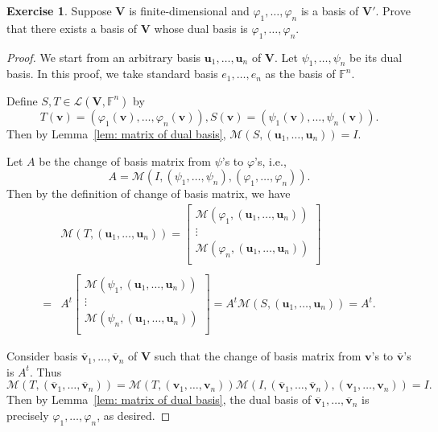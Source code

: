 \documentclass{tufte-handout}
\def \v {\vspace{0.2cm}}
\theoremstyle{plain} %
\theoremstyle{definition}
\newtheorem{exer}[thm]{Exercise}
\theoremstyle{remark}
\newcommand{\bra}[1]{\mathopen{}\left(#1\right)}
\renewcommand{\phi}{\varphi}
\newcommand{\F}{\mathbb{F}}
\newcommand{\mL}{\mathcal{L}}
\newcommand{\mM}{\mathcal{M}}
\newcommand{\V}{\bm{V}}
\renewcommand{\u}{\bm{u}}
\renewcommand{\v}{\bm{v}}
\renewcommand{\intercal}{t}
\begin{document}
\begin{exer}
	Suppose $\V$ is finite-dimensional and $\phi_1,\dots,\phi_n$ is a basis of $\V'$. Prove that there exists a basis of $\V$ whose dual basis is $\phi_1,\dots,\phi_n$.
\end{exer}
\begin{proof}
	We start from an arbitrary basis $\u_1,\dots,\u_n$ of $\V$. Let $\psi_1,\dots,\psi_n$ be its dual basis. In this proof, we take standard basis $e_1,\dots,e_n$ as the basis of $\F^n$.
	
	Define $S,T\in\mL\bra{\V,\F^n}$ by
	\[T(\v)=\bra{\phi_1(\v),\dots,\phi_n(\v)},S(\v)=\bra{\psi_1(\v),\dots,\psi_n(\v)}.\]
	Then by Lemma~\ref{lem: matrix of dual basis}, $\mM\bra{S,\bra{\u_1,\dots,\u_n}}=I$.
	
	Let $A$ be the change of basis matrix from $\psi$'s to $\phi$'s, i.e.,
	\[A=\mM\bra{I,\bra{\psi_1,\dots,\psi_n},\bra{\phi_1,\dots,\phi_n}}.\]
	Then by the definition of change of basis matrix, we have
	\begin{align*}
		&\mM\bra{T,\bra{\u_1,\dots,\u_n}}=\begin{bmatrix}
			\mM\bra{\phi_1,\bra{\u_1,\dots,\u_n}}\\
			\vdots\\
			\mM\bra{\phi_n,\bra{\u_1,\dots,\u_n}}\\
		\end{bmatrix}\\\\
		=&A^\intercal\begin{bmatrix}
			\mM\bra{\psi_1,\bra{\u_1,\dots,\u_n}}\\
			\vdots\\
			\mM\bra{\psi_n,\bra{\u_1,\dots,\u_n}}\\
		\end{bmatrix}=A^\intercal\mM\bra{S,\bra{\u_1,\dots,\u_n}}=A^\intercal.
	\end{align*}\vspace{0em}

	Consider basis $\overline{\v}_1,\dots,\overline{\v}_n$ of $\V$ such that the change of basis matrix from $\v$'s to $\overline{\v}$'s is $A^\intercal$. Thus
	\[\mM\bra{T,\bra{\overline{\v}_1,\dots,\overline{\v}_n}}=\mM\bra{T,\bra{\v_1,\dots,\v_n}}\mM\bra{I,\bra{\overline{\v}_1,\dots,\overline{\v}_n},\bra{\v_1,\dots,\v_n}}=I.\]
	Then by Lemma~\ref{lem: matrix of dual basis}, the dual basis of $\overline{\v}_1,\dots,\overline{\v}_n$ is precisely $\phi_1,\dots,\phi_n$, as desired.
\end{proof}
\end{document}
